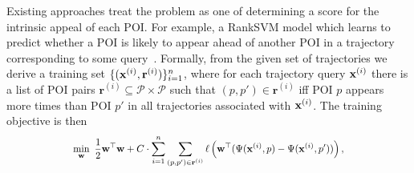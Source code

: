 Existing approaches treat the problem as one of determining a score for the intrinsic appeal of each POI.
For example, a RankSVM model
which %
learns to predict whether a POI is likely to appear ahead of another POI in a trajectory corresponding to some query~\cite{cikm16paper}.
Formally,
from the given set of trajectories
we derive a training set
$\{ ( \mathbf{x}^{(i)}, \mathbf{r}^{(i)} ) \}_{i = 1}^n$,
where for each trajectory query $\mathbf{x}^{(i)}$ there is a list of  POI pairs
$\mathbf{r}^{(i)} \subseteq \mathcal{P} \times \mathcal{P}$
such that
$(p, p') \in \mathbf{r}^{(i)}$
iff
POI $p$ appears more times than POI $p'$ in all trajectories associated with $\mathbf{x}^{(i)}$. %
The training objective is then
\begin{align}
\resizebox{0.7\linewidth}{!}{$\displaystyle
\displaystyle \min_{\w} ~\frac{1}{2} \w^\top \w + C \cdot \sum_{i = 1}^n \sum_{(p, p') \in \mathbf{r}^{(i)}} 
\ell\left( \w^\top ( \Psi( \x^{(i)}, p ) - \Psi( \x^{(i)}, p' ) ) \right),
$} \label{eq:ranksvm}
\end{align}
